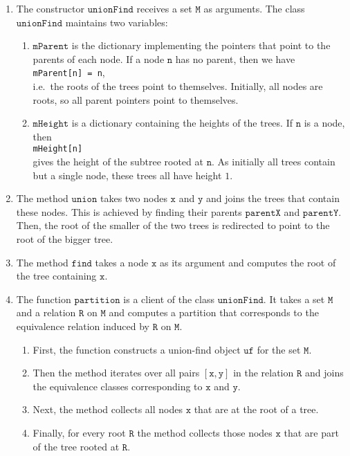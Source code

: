 \begin{enumerate}
\item The constructor $\mathtt{unionFind}$ receives a set $\mathtt{M}$ as arguments.  The class
      $\mathtt{unionFind}$ maintains two variables:
      \begin{enumerate}
      \item $\mathtt{mParent}$ is the dictionary implementing the pointers that point to the parents
             of each node.  If a node $\mathtt{n}$ has no parent, then we have
             \\[0.2cm]
             \hspace*{1.3cm}
             \texttt{mParent[n] = n},
             \\[0.2cm]
             i.e.~the roots of the trees point to themselves.  Initially, all nodes are roots, so
             all parent pointers point to themselves.
      \item $\mathtt{mHeight}$ is a dictionary containing the heights of the trees.  If $\mathtt{n}$ is
            a node, then
            \\[0.2cm]
            \hspace*{1.3cm}
            \texttt{mHeight[n]}
            \\[0.2cm]
            gives the height of the subtree rooted at $\mathtt{n}$. As initially all trees contain but
            a single node, these trees all have height $1$.
      \end{enumerate}
\item The method $\mathtt{union}$ takes two nodes $\mathtt{x}$ and $\mathtt{y}$ and joins the trees that
      contain these nodes.  This is achieved by finding their parents $\mathtt{parentX}$ and
      $\mathtt{parentY}$.  Then, the root of the smaller of the two trees is redirected to point to
      the root of the bigger tree.
\item The method $\mathtt{find}$ takes a node $\mathtt{x}$ as its argument and computes the root of the
      tree containing $\mathtt{x}$. 
\item The function $\mathtt{partition}$ is a client of the class $\mathtt{unionFind}$.  It takes a set
      $\mathtt{M}$ and a relation $\mathtt{R}$ on $\mathtt{M}$ and computes a partition that corresponds
      to the equivalence relation induced by $\mathtt{R}$ on $\mathtt{M}$. 
      \begin{enumerate}
      \item First, the function constructs a union-find object $\mathtt{uf}$ for the set $\mathtt{M}$.
      \item Then the method iterates over all pairs $[\mathtt{x},\mathtt{y}]$ in the relation $\mathtt{R}$ and
            joins the equivalence classes corresponding to $\mathtt{x}$ and $\mathtt{y}$.
      \item Next, the method collects all nodes $\mathtt{x}$ that are at the root of a tree.
      \item Finally, for every root $\mathtt{R}$ the method collects those nodes $\mathtt{x}$ that are
            part of the tree rooted at $\mathtt{R}$.
      \end{enumerate}
\end{enumerate}


